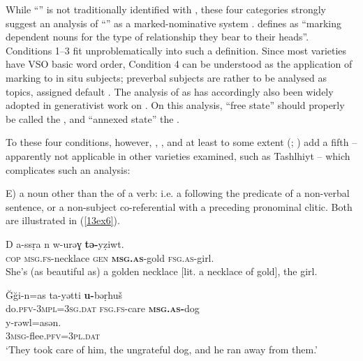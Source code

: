 \documentclass[output=paper,colorlinks,citecolor=brown]{langscibook}
\begin{document}
While ``'' is not traditionally identified with , these four categories strongly suggest an analysis of ``'' as a marked-nominative  system \citep{sasse1984, konig2008, belkadi2024}. \citet[1]{blake1994} defines  as ``marking dependent nouns for the type of relationship they bear to their heads''. Conditions 1--3 fit unproblematically into such a definition. Since most  varieties have VSO basic word order, Condition 4 can be understood as the application of  marking to in situ subjects; preverbal subjects are rather to be analysed as topics, assigned default . The analysis of  as  has accordingly also been widely adopted in generativist work on  \citep{guerssel1992, felice2020, belkadi2024}. On this analysis, ``free state'' should properly be called the , and ``annexed state'' the .

To these four conditions, however,  \citep{mettouchifrajzyngier2013},  \citep[96]{abdessalamabdessalam1996}, and at least to some extent  (\citealt{lafkioui2000}; \citealt[39, 132]{mourighkossmann2020}) add a fifth -- apparently not applicable in other varieties examined, such as Tashlhiyt \citep{mettouchifleisch2010} -- which complicates such an analysis:

\medskip

\noindent E) a  noun other than the  of a verb: i.e. a  following the predicate of a non-verbal sentence, or a non-subject co-referential with a preceding pronominal clitic. Both are illustrated in (\ref{13ex6}).

\begin{exe}
	\ex \label{13ex6}  \citep[96]{abdessalamabdessalam1996}
	\begin{xlist}
		\ex \label{13ex6a}
		\gll D a-ssṛa n w-urəɣ \textbf{tə-}yẓiwt. \\
		\textsc{cop} \textsc{msg.fs-}necklace \textsc{gen} \textbf{\textsc{msg.as}}-gold \textsc{fsg.as-}girl. \\
		\trans She’s (as beautiful as) a golden necklace [lit. a necklace of gold], the girl.
		
		\ex \label{13ex6b}
		\gll Ğği-n=as ta-yətti \textbf{u-}bəṛhuš \\
		do.\textsc{pfv-3mpl=3sg.dat} \textsc{fsg.fs-}care \textbf{\textsc{msg.as-}}dog \\

		y-rəwl=asən. \\
		\textsc{3msg-}flee.\textsc{pfv=3pl.dat} \\
		\trans ‘They took care of him, the ungrateful dog, and he ran away from them.’
	\end{xlist}
\end{exe}
\end{document}
